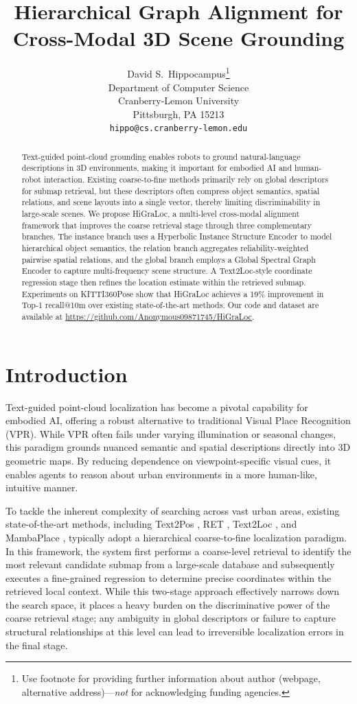 \documentclass{article}
\title{Hierarchical Graph Alignment for Cross-Modal 3D Scene Grounding}
\author{%
  David S.~Hippocampus\thanks{Use footnote for providing further information
    about author (webpage, alternative address)---\emph{not} for acknowledging
    funding agencies.} \\
  Department of Computer Science\\
  Cranberry-Lemon University\\
  Pittsburgh, PA 15213 \\
  \texttt{hippo@cs.cranberry-lemon.edu} \\
}
\begin{document}
\maketitle

\begin{abstract}
Text-guided point-cloud grounding enables robots to ground natural-language descriptions in 3D environments, making it important for embodied AI and human-robot interaction. Existing coarse-to-fine methods primarily rely on global descriptors for submap retrieval, but these descriptors often compress object semantics, spatial relations, and scene layouts into a single vector, thereby limiting discriminability in large-scale scenes. We propose HiGraLoc, a multi-level cross-modal alignment framework that improves the coarse retrieval stage through three complementary branches. The instance branch uses a Hyperbolic Instance Structure Encoder to model hierarchical object semantics, the relation branch aggregates reliability-weighted pairwise spatial relations, and the global branch employs a Global Spectral Graph Encoder to capture multi-frequency scene structure. A Text2Loc-style coordinate regression stage then refines the location estimate within the retrieved submap. Experiments on KITTI360Pose show that HiGraLoc achieves a 19\% improvement in Top-1 recall@10m over existing state-of-the-art methods. Our code and dataset are available at \url{https://github.com/Anonymous09871745/HiGraLoc}.
\end{abstract}
\section{Introduction}
Text-guided point-cloud localization has become a pivotal capability for embodied AI, offering a robust alternative to traditional Visual Place Recognition (VPR). While VPR often fails under varying illumination or seasonal changes, this paradigm grounds nuanced semantic and spatial descriptions directly into 3D geometric maps. By reducing dependence on viewpoint-specific visual cues, it enables agents to reason about urban environments in a more human-like, intuitive manner.

To tackle the inherent complexity of searching across vast urban areas, existing state-of-the-art methods, including Text2Pos \cite{kolmet2022text2pos}, RET \cite{wang2023text}, Text2Loc \cite{xia2024text2loc}, and MambaPlace \cite{shang2024mambaplace}, typically adopt a hierarchical coarse-to-fine localization paradigm. In this framework, the system first performs a coarse-level retrieval to identify the most relevant candidate submap from a large-scale database and subsequently executes a fine-grained regression to determine precise coordinates within the retrieved local context. While this two-stage approach effectively narrows down the search space, it places a heavy burden on the discriminative power of the coarse retrieval stage; any ambiguity in global descriptors or failure to capture structural relationships at this level can lead to irreversible localization errors in the final stage.
\end{document}
